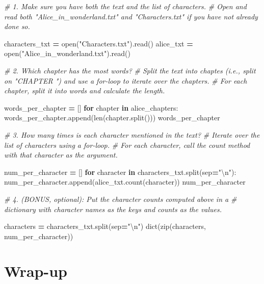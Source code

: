 \documentclass[]{book}
\newenvironment{Shaded}{\begin{snugshade}}{\end{snugshade}}
\newcommand{\BuiltInTok}[1]{#1}
\newcommand{\CharTok}[1]{\textcolor[rgb]{0.31,0.60,0.02}{#1}}
\newcommand{\CommentTok}[1]{\textcolor[rgb]{0.56,0.35,0.01}{\textit{#1}}}
\newcommand{\ControlFlowTok}[1]{\textcolor[rgb]{0.13,0.29,0.53}{\textbf{#1}}}
\newcommand{\KeywordTok}[1]{\textcolor[rgb]{0.13,0.29,0.53}{\textbf{#1}}}
\newcommand{\NormalTok}[1]{#1}
\newcommand{\OperatorTok}[1]{\textcolor[rgb]{0.81,0.36,0.00}{\textbf{#1}}}
\newcommand{\StringTok}[1]{\textcolor[rgb]{0.31,0.60,0.02}{#1}}
\begin{document}
\begin{Shaded}
\begin{Highlighting}[]
\CommentTok{# 1. Make sure you have both the text and the list of characters.}
\CommentTok{# Open and read both "Alice_in_wonderland.txt" and "Characters.txt" if you have not already done so.}

\NormalTok{characters_txt }\OperatorTok{=} \BuiltInTok{open}\NormalTok{(}\StringTok{"Characters.txt"}\NormalTok{).read()}
\NormalTok{alice_txt }\OperatorTok{=} \BuiltInTok{open}\NormalTok{(}\StringTok{"Alice_in_wonderland.txt"}\NormalTok{).read()}

\CommentTok{# 2. Which chapter has the most words?}
\CommentTok{# Split the text into chaptes (i.e., split on "CHAPTER ") and use a for-loop to iterate over the chapters.}
\CommentTok{# For each chapter, split it into words and calculate the length.}

\NormalTok{words_per_chapter }\OperatorTok{=}\NormalTok{ []}
\ControlFlowTok{for}\NormalTok{ chapter }\KeywordTok{in}\NormalTok{ alice_chapters:}
\NormalTok{    words_per_chapter.append(}\BuiltInTok{len}\NormalTok{(chapter.split()))}
\NormalTok{words_per_chapter}

\CommentTok{# 3. How many times is each character mentioned in the text?}
\CommentTok{# Iterate over the list of characters using a for-loop. }
\CommentTok{# For each character, call the count method with that character as the argument.}

\NormalTok{num_per_character }\OperatorTok{=}\NormalTok{ []}
\ControlFlowTok{for}\NormalTok{ character }\KeywordTok{in}\NormalTok{ characters_txt.split(sep}\OperatorTok{=}\StringTok{"}\CharTok{\textbackslash{}n}\StringTok{"}\NormalTok{):}
\NormalTok{    num_per_character.append(alice_txt.count(character))}
\NormalTok{num_per_character}

\CommentTok{# 4. (BONUS, optional): Put the character counts computed above in a }
\CommentTok{# dictionary with character names as the keys and counts as the values.}

\NormalTok{characters }\OperatorTok{=}\NormalTok{ characters_txt.split(sep}\OperatorTok{=}\StringTok{"}\CharTok{\textbackslash{}n}\StringTok{"}\NormalTok{)}
\BuiltInTok{dict}\NormalTok{(}\BuiltInTok{zip}\NormalTok{(characters, num_per_character))}
\end{Highlighting}
\end{Shaded}

\hypertarget{wrap-up-5}{%
\section{Wrap-up}\label{wrap-up-5}}
\end{document}
